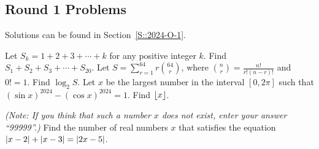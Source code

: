 \subsection{Round 1 Problems}

Solutions can be found in Section~\ref{S::2024-O-1}.

\begin{enumerate}
    \hyperrefitem[A::2024-O-1-1] Let $S_k = 1 + 2 + 3 + \cdots + k$ for any positive integer $k$. Find $S_1 + S_2 + S_3 + \cdots + S_{20}$.
    \hyperrefitem[A::2024-O-1-2] Let $S = \sum_{r=1}^{64} r\binom{64}{r}$, where $\binom{n}{r} = \frac{n!}{r! (n-r)!}$ and $0! = 1$. Find $\log_2 S$.
    \hyperrefitem[A::2024-O-1-3] Let $x$ be the largest number in the interval $[0, 2\pi]$ such that $(\sin x)^{2024} - (\cos x)^{2024} = 1$. Find $\left\lfloor x \right\rfloor$.

    \textit{(Note: If you think that such a number $x$ does not exist, enter your answer ``99999''.)}
    \hyperrefitem[A::2024-O-1-4] Find the number of real numbers $x$ that satisfies the equation $\left\lvert x - 2 \right\rvert + \left\lvert x - 3 \right\rvert = \left\lvert 2x - 5 \right\rvert$.


\end{enumerate}
